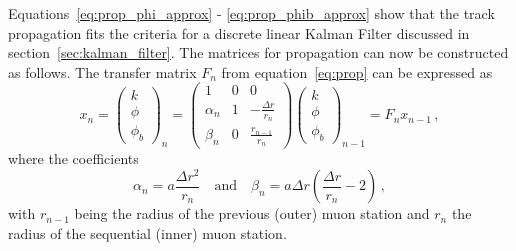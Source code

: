 Equations~\ref{eq:prop_phi_approx} - \ref{eq:prop_phib_approx} show that the track propagation fits the criteria for a discrete linear Kalman Filter discussed in section~\ref{sec:kalman_filter}. The matrices for propagation can now be constructed as follows. The transfer matrix $F_n$ from equation~\ref{eq:prop} can be expressed as
\begin{equation}
	\label{eq:kmtfProp}
	x_{n}=\left(\begin{matrix}
		k\\
		\phi\\
		\phi_b
	\end{matrix}\right)_{n} = 
\left(\begin{matrix}
	1 & 0 & 0\\
	\alpha_n & 1 & -\frac{\Delta r}{r_n}\\
	\beta_n & 0 & \frac{r_{n-1}}{r_n}
\end{matrix}\right)
\left(\begin{matrix}
	k\\
	\phi\\
	\phi_b
\end{matrix}\right)_{n-1}=F_nx_{n-1}\,,
\end{equation}
where the coefficients
\begin{equation}
	\label{eq:kmtf_coeff}
	\alpha_n=a\frac{\Delta r^2}{r_n} \quad \mathrm{and} \quad \beta_n=a\Delta r\left(\frac{\Delta r}{r_n}-2\right)\,,
\end{equation}
with $r_{n-1}$ being the radius of the previous (outer) muon station and $r_n$ the radius of the sequential (inner) muon station.

